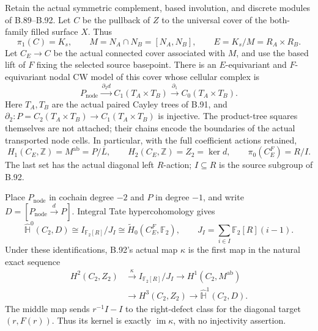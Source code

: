 \label{stmt:B102}
Retain the actual symmetric complement, based involution, and discrete
modules of B.89--B.92. Let $C$ be the pullback of $Z$ to the universal
cover of the both-family filled surface $X$. Thus
\[
 \pi_1(C)=K_s,\qquad M=N_A\cap N_B=[N_A,N_B],\qquad
 E=K_s/M=R_A\times R_B.
\]
Let $C_E\to C$ be the actual connected cover associated with $M$,
and use the based lift of $F$ fixing the selected source basepoint.
There is an $E$-equivariant and $F$-equivariant nodal CW model of this
cover whose cellular complex is
\begin{equation}\label{eq:B102-cover-complex}
 P_{\mathrm{node}}\xrightarrow{\,\partial_2d\,}
 C_1(T_A\times T_B)\xrightarrow{\,\partial_1\,}
 C_0(T_A\times T_B).
\end{equation}
Here $T_A,T_B$ are the actual paired Cayley trees of B.91, and
$\partial_2:P=C_2(T_A\times T_B)\to C_1(T_A\times T_B)$ is
injective. The product-tree squares themselves are not attached;
their chains encode the boundaries of the actual transported node
cells. In particular, with the full coefficient actions retained,
\begin{equation}\label{eq:B102-cover-homology}
 H_1(C_E,\mathbb Z)=M^{\mathrm{ab}}=P/\overline L,
 \qquad H_2(C_E,\mathbb Z)=Z_2=\ker d,
 \qquad \pi_0(C_E^F)=R/I.
\end{equation}
The last set has the actual diagonal left $R$-action; $I\subseteq R$
is the source subgroup of B.92.

Place $P_{\mathrm{node}}$ in cochain degree $-2$ and $P$ in degree
$-1$, and write $D=[P_{\mathrm{node}}\xrightarrow d P]$.
Integral Tate hypercohomology gives
\begin{equation}\label{eq:B102-hyper-identification}
 \widehat{\mathbb H}^{0}(C_2,D)
   \cong I_{\mathbb F_2[R]}/J_I
   \cong \widetilde H_0(C_E^F,\mathbb F_2),
 \qquad J_I=\sum_{i\in I}\mathbb F_2[R](i-1).
\end{equation}
Under these identifications, B.92's actual map $\kappa$ is the first
map in the natural exact sequence
\begin{equation}\label{eq:B102-edge-sequence}
 \begin{aligned}
 H^2(C_2,Z_2)&\xrightarrow{\ \kappa\ }
       I_{\mathbb F_2[R]}/J_I
       \longrightarrow H^1(C_2,M^{\mathrm{ab}})\\
 &\longrightarrow H^3(C_2,Z_2)
       \longrightarrow\widehat{\mathbb H}^{1}(C_2,D).
 \end{aligned}
\end{equation}
The middle map sends $r^{-1}I-I$ to the right-defect class for the
diagonal target $(r,F(r))$. Thus its kernel is exactly
$\operatorname{im}\kappa$, with no injectivity assertion.

